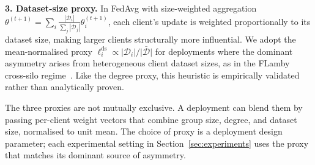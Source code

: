 \documentclass[letterpaper,journal]{IEEEtran}
\begin{document}
\noindent\textbf{3. Dataset-size proxy.} In FedAvg with
size-weighted aggregation
$\theta^{(t+1)} = \sum_i \frac{|\mathcal{D}_i|}{\sum_j |\mathcal{D}_j|}
\theta_i^{(t+1)}$,
each client's update is weighted proportionally to its dataset size,
making larger clients structurally more influential. We adopt the
mean-normalised proxy
$\ell_i^{\mathrm{ds}} \propto |\mathcal{D}_i|/\bar{|\mathcal{D}|}$
for deployments where the dominant asymmetry arises from
heterogeneous client dataset sizes, as in the FLamby cross-silo
regime~\cite{flamby2022}. Like the degree proxy, this heuristic is
empirically validated rather than analytically proven.\smallskip

\noindent The three proxies are not mutually exclusive. A deployment can blend
them by passing per-client weight vectors that combine group size,
degree, and dataset size, normalised to unit mean. The choice of proxy
is a deployment design parameter; each experimental setting in
Section~\ref{sec:experiments} uses the proxy that matches its
dominant source of asymmetry.


\end{document}
